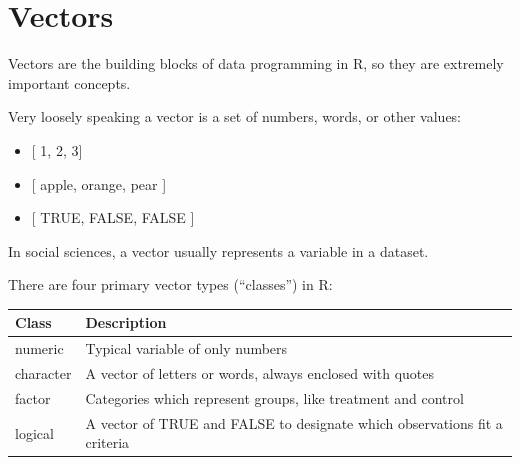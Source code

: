 \documentclass[]{book}
\providecommand{\tightlist}{%
  \setlength{\itemsep}{0pt}\setlength{\parskip}{0pt}}
\theoremstyle{definition}
\theoremstyle{definition}
\theoremstyle{definition}
\theoremstyle{remark}
\begin{document}
\hypertarget{vectors}{%
\section{Vectors}\label{vectors}}

Vectors are the building blocks of data programming in R, so they are
extremely important concepts.

Very loosely speaking a vector is a set of numbers, words, or other
values:

\begin{itemize}
\tightlist
\item
  {[} 1, 2, 3{]}
\item
  {[} apple, orange, pear {]}
\item
  {[} TRUE, FALSE, FALSE {]}
\end{itemize}

In social sciences, a vector usually represents a variable in a dataset.

There are four primary vector types (``classes'') in R:

\begin{longtable}[]{@{}ll@{}}
\toprule
\begin{minipage}[b]{0.45\columnwidth}\raggedright
Class\strut
\end{minipage} & \begin{minipage}[b]{0.49\columnwidth}\raggedright
Description\strut
\end{minipage}\tabularnewline
\midrule
\endhead
\begin{minipage}[t]{0.45\columnwidth}\raggedright
numeric\strut
\end{minipage} & \begin{minipage}[t]{0.49\columnwidth}\raggedright
Typical variable of only numbers\strut
\end{minipage}\tabularnewline
\begin{minipage}[t]{0.45\columnwidth}\raggedright
character\strut
\end{minipage} & \begin{minipage}[t]{0.49\columnwidth}\raggedright
A vector of letters or words, always enclosed with quotes\strut
\end{minipage}\tabularnewline
\begin{minipage}[t]{0.45\columnwidth}\raggedright
factor\strut
\end{minipage} & \begin{minipage}[t]{0.49\columnwidth}\raggedright
Categories which represent groups, like treatment and control\strut
\end{minipage}\tabularnewline
\begin{minipage}[t]{0.45\columnwidth}\raggedright
logical\strut
\end{minipage} & \begin{minipage}[t]{0.49\columnwidth}\raggedright
A vector of TRUE and FALSE to designate which observations fit a
criteria\strut
\end{minipage}\tabularnewline
\bottomrule
\end{longtable}
\end{document}
